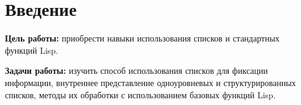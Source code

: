 \section*{Введение}

\textbf{Цель работы:} приобрести навыки использования списков и стандартных
функций Lisp.

\textbf{Задачи работы:} изучить способ использования списков для фиксации
информации, внутреннее представление одноуровневых и структурированных списков,
методы их обработки с использованием базовых функций Lisp.

